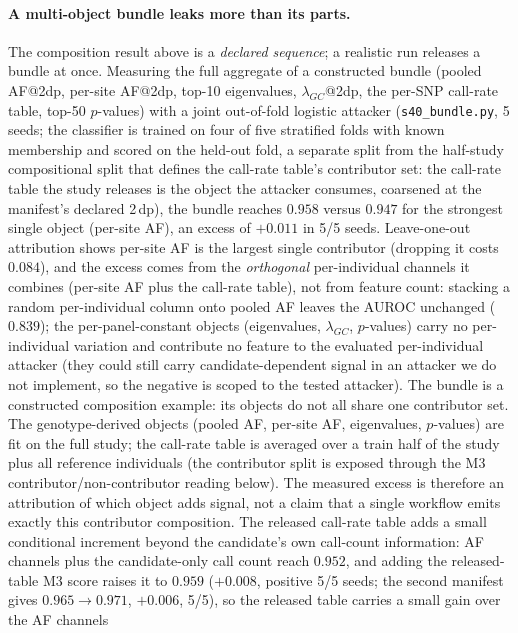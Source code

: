 \documentclass[11pt]{article}
\begin{document}
\paragraph{A multi-object bundle leaks more than its parts.} The composition
result above is a \emph{declared sequence}; a realistic run releases a bundle at
once. Measuring the full aggregate of a constructed bundle
(pooled AF@2dp, per-site AF@2dp, top-10 eigenvalues, $\lambda_{GC}$@2dp, the
per-SNP call-rate table, top-50 $p$-values) with a joint out-of-fold logistic
attacker (\texttt{s40\_bundle.py}, 5 seeds; the classifier is trained on four of
five stratified folds with known membership and scored on the held-out fold, a
separate split from the half-study compositional split that defines the call-rate
table's contributor set: the call-rate table the study
releases is the object the attacker consumes, coarsened at the manifest's
declared 2\,dp), the bundle reaches $0.958$ versus
$0.947$ for the strongest single object (per-site AF), an excess of $+0.011$ in
5/5 seeds. Leave-one-out attribution shows per-site AF is the largest single
contributor (dropping it costs $0.084$), and the excess comes from the
\emph{orthogonal} per-individual channels it combines (per-site AF plus the
call-rate table), not from feature count: stacking a random per-individual
column onto pooled AF leaves the AUROC unchanged ($0.839$); the
per-panel-constant objects (eigenvalues, $\lambda_{GC}$, $p$-values) carry no
per-individual variation and contribute no feature to the evaluated
per-individual attacker (they could still carry candidate-dependent signal in an
attacker we do not implement, so the negative is scoped to the tested attacker).
The bundle is a constructed composition example: its objects do not all share
one contributor set. The genotype-derived objects (pooled AF, per-site AF,
eigenvalues, $p$-values) are fit on the full study; the call-rate table is
averaged over a train half of the study plus all reference individuals (the
contributor split is exposed through the M3 contributor/non-contributor reading
below). The measured excess is therefore an attribution of which object adds
signal, not a claim that a single workflow emits exactly this contributor
composition.
The released call-rate table adds a small conditional increment beyond the
candidate's own call-count information: AF channels plus the candidate-only call
count reach $0.952$, and adding the released-table M3 score raises it to $0.959$
($+0.008$, positive 5/5 seeds; the second manifest gives $0.965{\to}0.971$,
$+0.006$, 5/5), so the released table carries a small gain over the AF channels
\end{document}
